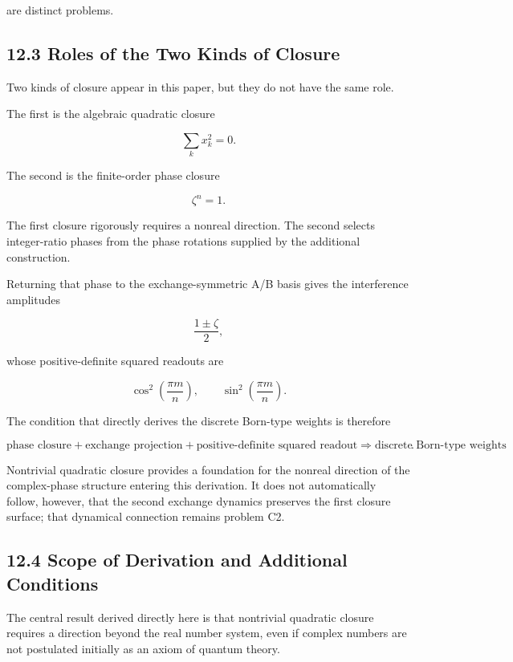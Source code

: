 \documentclass[
  a4paper,
  10pt]{article}
\begin{document}
are distinct problems.

\subsection{12.3 Roles of the Two Kinds of
Closure}\label{123-roles-of-the-two-kinds-of-closure}

Two kinds of closure appear in this paper, but they do not have the same
role.

The first is the algebraic quadratic closure

\[
\sum_kx_k^2=0.
\]

The second is the finite-order phase closure

\[
\zeta^n=1.
\]

The first closure rigorously requires a nonreal direction. The second
selects integer-ratio phases from the phase rotations supplied by the
additional construction.

Returning that phase to the exchange-symmetric A/B basis gives the
interference amplitudes

\[
\frac{1\pm\zeta}{2},
\]

whose positive-definite squared readouts are

\[
\cos^2\left(\frac{\pi m}{n}\right),
\qquad
\sin^2\left(\frac{\pi m}{n}\right).
\]

The condition that directly derives the discrete Born-type weights is
therefore

\[
\boxed{
\text{phase closure}
+
\text{exchange projection}
+
\text{positive-definite squared readout}
\Rightarrow
\text{discrete Born-type weights}
}.
\]

Nontrivial quadratic closure provides a foundation for the nonreal
direction of the complex-phase structure entering this derivation. It
does not automatically follow, however, that the second exchange
dynamics preserves the first closure surface; that dynamical connection
remains problem C2.

\subsection{12.4 Scope of Derivation and Additional
Conditions}\label{124-scope-of-derivation-and-additional-conditions}

The central result derived directly here is that nontrivial quadratic
closure requires a direction beyond the real number system, even if
complex numbers are not postulated initially as an axiom of quantum
theory.
\end{document}

